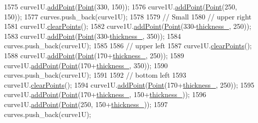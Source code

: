 \begin{DoxyCode}
1575     curve1U.\mbox{\hyperlink{class_bezier_curve_a38d16c18b36ae45619b05e26e226cf34}{addPoint}}(\mbox{\hyperlink{class_point}{Point}}(330, 150));
1576     curve1U.\mbox{\hyperlink{class_bezier_curve_a38d16c18b36ae45619b05e26e226cf34}{addPoint}}(\mbox{\hyperlink{class_point}{Point}}(250, 150));
1577     curves.push\_back(curve1U);
1578 
1579     \textcolor{comment}{// Small}
1580     \textcolor{comment}{// upper right}
1581     curve1U.\mbox{\hyperlink{class_bezier_curve_a0ba8ce66d5af5971ae6a1b506029728e}{clearPoints}}();
1582     curve1U.\mbox{\hyperlink{class_bezier_curve_a38d16c18b36ae45619b05e26e226cf34}{addPoint}}(\mbox{\hyperlink{class_point}{Point}}(330-\mbox{\hyperlink{class_font_v1_aed8040e76be9a52833627b92f0fb4e5f}{thickness\_}}, 250));
1583     curve1U.\mbox{\hyperlink{class_bezier_curve_a38d16c18b36ae45619b05e26e226cf34}{addPoint}}(\mbox{\hyperlink{class_point}{Point}}(330-\mbox{\hyperlink{class_font_v1_aed8040e76be9a52833627b92f0fb4e5f}{thickness\_}}, 350));
1584     curves.push\_back(curve1U);
1585 
1586     \textcolor{comment}{// upper left}
1587     curve1U.\mbox{\hyperlink{class_bezier_curve_a0ba8ce66d5af5971ae6a1b506029728e}{clearPoints}}();
1588     curve1U.\mbox{\hyperlink{class_bezier_curve_a38d16c18b36ae45619b05e26e226cf34}{addPoint}}(\mbox{\hyperlink{class_point}{Point}}(170+\mbox{\hyperlink{class_font_v1_aed8040e76be9a52833627b92f0fb4e5f}{thickness\_}}, 250));
1589     curve1U.\mbox{\hyperlink{class_bezier_curve_a38d16c18b36ae45619b05e26e226cf34}{addPoint}}(\mbox{\hyperlink{class_point}{Point}}(170+\mbox{\hyperlink{class_font_v1_aed8040e76be9a52833627b92f0fb4e5f}{thickness\_}}, 350));
1590     curves.push\_back(curve1U);
1591 
1592     \textcolor{comment}{// bottom left}
1593     curve1U.\mbox{\hyperlink{class_bezier_curve_a0ba8ce66d5af5971ae6a1b506029728e}{clearPoints}}();
1594     curve1U.\mbox{\hyperlink{class_bezier_curve_a38d16c18b36ae45619b05e26e226cf34}{addPoint}}(\mbox{\hyperlink{class_point}{Point}}(170+\mbox{\hyperlink{class_font_v1_aed8040e76be9a52833627b92f0fb4e5f}{thickness\_}}, 250));
1595     curve1U.\mbox{\hyperlink{class_bezier_curve_a38d16c18b36ae45619b05e26e226cf34}{addPoint}}(\mbox{\hyperlink{class_point}{Point}}(170+\mbox{\hyperlink{class_font_v1_aed8040e76be9a52833627b92f0fb4e5f}{thickness\_}}, 150+\mbox{\hyperlink{class_font_v1_aed8040e76be9a52833627b92f0fb4e5f}{thickness\_}}));
1596     curve1U.\mbox{\hyperlink{class_bezier_curve_a38d16c18b36ae45619b05e26e226cf34}{addPoint}}(\mbox{\hyperlink{class_point}{Point}}(250, 150+\mbox{\hyperlink{class_font_v1_aed8040e76be9a52833627b92f0fb4e5f}{thickness\_}}));
1597     curves.push\_back(curve1U);

\end{DoxyCode}
